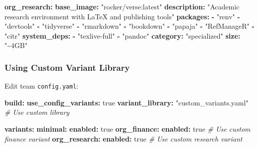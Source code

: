 \documentclass[
]{article}
\newenvironment{Shaded}{\begin{snugshade}}{\end{snugshade}}
\newcommand{\AttributeTok}[1]{\textcolor[rgb]{0.13,0.29,0.53}{#1}}
\newcommand{\CharTok}[1]{\textcolor[rgb]{0.31,0.60,0.02}{#1}}
\newcommand{\CommentTok}[1]{\textcolor[rgb]{0.56,0.35,0.01}{\textit{#1}}}
\newcommand{\FunctionTok}[1]{\textcolor[rgb]{0.13,0.29,0.53}{\textbf{#1}}}
\newcommand{\KeywordTok}[1]{\textcolor[rgb]{0.13,0.29,0.53}{\textbf{#1}}}
\newcommand{\StringTok}[1]{\textcolor[rgb]{0.31,0.60,0.02}{#1}}
\begin{document}
\begin{Shaded}
\begin{Highlighting}[]
\FunctionTok{org\_research}\KeywordTok{:}
\AttributeTok{  }\FunctionTok{base\_image}\KeywordTok{:}\AttributeTok{ }\StringTok{"rocker/verse:latest"}
\AttributeTok{  }\FunctionTok{description}\KeywordTok{:}\AttributeTok{ }\StringTok{"Academic research environment with LaTeX and publishing tools"}
\AttributeTok{  }\FunctionTok{packages}\KeywordTok{:}
\AttributeTok{    }\KeywordTok{{-}}\AttributeTok{ }\StringTok{"renv"}
\AttributeTok{    }\KeywordTok{{-}}\AttributeTok{ }\StringTok{"devtools"}
\AttributeTok{    }\KeywordTok{{-}}\AttributeTok{ }\StringTok{"tidyverse"}
\AttributeTok{    }\KeywordTok{{-}}\AttributeTok{ }\StringTok{"rmarkdown"}
\AttributeTok{    }\KeywordTok{{-}}\AttributeTok{ }\StringTok{"bookdown"}
\AttributeTok{    }\KeywordTok{{-}}\AttributeTok{ }\StringTok{"papaja"}
\AttributeTok{    }\KeywordTok{{-}}\AttributeTok{ }\StringTok{"RefManageR"}
\AttributeTok{    }\KeywordTok{{-}}\AttributeTok{ }\StringTok{"citr"}
\AttributeTok{  }\FunctionTok{system\_deps}\KeywordTok{:}
\AttributeTok{    }\KeywordTok{{-}}\AttributeTok{ }\StringTok{"texlive{-}full"}
\AttributeTok{    }\KeywordTok{{-}}\AttributeTok{ }\StringTok{"pandoc"}
\AttributeTok{  }\FunctionTok{category}\KeywordTok{:}\AttributeTok{ }\StringTok{"specialized"}
\AttributeTok{  }\FunctionTok{size}\KeywordTok{:}\AttributeTok{ }\StringTok{"\textasciitilde{}4GB"}
\end{Highlighting}
\end{Shaded}

\subsubsection{Using Custom Variant
Library}\label{using-custom-variant-library}

Edit team \texttt{config.yaml}:

\begin{Shaded}
\begin{Highlighting}[]
\FunctionTok{build}\KeywordTok{:}
\AttributeTok{  }\FunctionTok{use\_config\_variants}\KeywordTok{:}\AttributeTok{ }\CharTok{true}
\AttributeTok{  }\FunctionTok{variant\_library}\KeywordTok{:}\AttributeTok{ }\StringTok{"custom\_variants.yaml"}\CommentTok{  \# Use custom library}

\FunctionTok{variants}\KeywordTok{:}
\AttributeTok{  }\FunctionTok{minimal}\KeywordTok{:}
\AttributeTok{    }\FunctionTok{enabled}\KeywordTok{:}\AttributeTok{ }\CharTok{true}
\AttributeTok{  }\FunctionTok{org\_finance}\KeywordTok{:}
\AttributeTok{    }\FunctionTok{enabled}\KeywordTok{:}\AttributeTok{ }\CharTok{true}\CommentTok{    \# Use custom finance variant}
\AttributeTok{  }\FunctionTok{org\_research}\KeywordTok{:}
\AttributeTok{    }\FunctionTok{enabled}\KeywordTok{:}\AttributeTok{ }\CharTok{true}\CommentTok{    \# Use custom research variant}
\end{Highlighting}
\end{Shaded}
\end{document}
